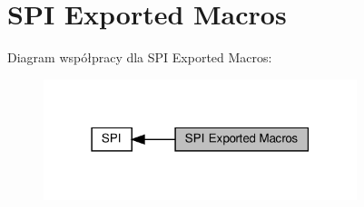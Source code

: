 \hypertarget{group___s_p_i___exported___macros}{}\section{S\+PI Exported Macros}
\label{group___s_p_i___exported___macros}
Diagram współpracy dla S\+PI Exported Macros\+:\nopagebreak
\begin{figure}[H]
\begin{center}
\leavevmode
\includegraphics[width=259pt]{group___s_p_i___exported___macros}
\end{center}
\end{figure}
